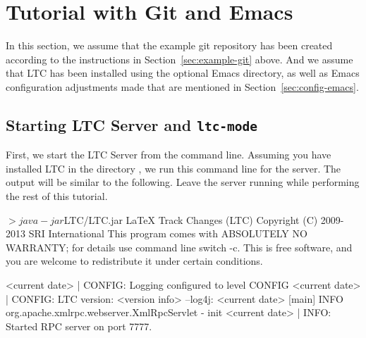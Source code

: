 \section{Tutorial with Git and Emacs} \label{sec:tutorial-git-emacs}

In this section, we assume that the example git repository has been created according to the instructions in Section~\ref{sec:example-git} above.  And we assume that LTC has been installed using the optional Emacs directory, as well as Emacs configuration adjustments made that are mentioned in Section~\ref{sec:config-emacs}.

\subsection{Starting LTC Server and \texttt{ltc-mode}}

First, we start the LTC Server from the command line.  Assuming you have installed LTC in the directory , we run this command line for the server.  The output will be similar to the following.  Leave the server running while performing the rest of this tutorial.
\begin{CodeVerbatim}
$> java -jar $LTC/LTC.jar
LaTeX Track Changes (LTC)  Copyright (C) 2009-2013  SRI International
This program comes with ABSOLUTELY NO WARRANTY; for details use command line switch -c.
This is free software, and you are welcome to redistribute it under certain conditions.

<current date> | CONFIG:  Logging configured to level CONFIG
<current date> | CONFIG:  LTC version: <version info>
--log4j: <current date> [main] INFO  org.apache.xmlrpc.webserver.XmlRpcServlet - init
<current date> | INFO:    Started RPC server on port 7777.
\end{CodeVerbatim}

